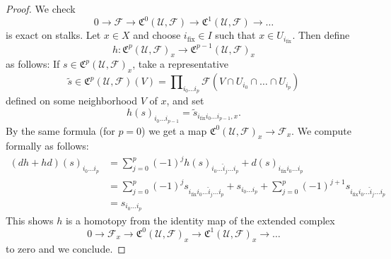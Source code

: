 \begin{proof}
We check
$$
0 \to \mathcal{F} \to \mathfrak{C}^0(\mathcal{U}, \mathcal{F}) \to
\mathfrak{C}^1(\mathcal{U}, \mathcal{F}) \to  \ldots
$$
is exact on stalks. Let $x \in X$ and choose $i_{\text{fix}} \in I$
such that $x \in U_{i_{\text{fix}}}$. Then define
$$
h : \mathfrak{C}^p(\mathcal{U}, \mathcal{F})_x
\to \mathfrak{C}^{p - 1}(\mathcal{U}, \mathcal{F})_x
$$
as follows: If $s \in \mathfrak{C}^p(\mathcal{U}, \mathcal{F})_x$, take
a representative
$$
\widetilde{s} \in
\mathfrak{C}^p(\mathcal{U}, \mathcal{F})(V) =
\prod\nolimits_{i_0 \ldots i_p}
\mathcal{F}(V \cap U_{i_0} \cap \ldots \cap U_{i_p})
$$
defined on some neighborhood $V$ of $x$, and set
$$
h(s)_{i_0 \ldots i_{p - 1}} =
\widetilde{s}_{i_{\text{fix}} i_0 \ldots i_{p - 1}, x}.
$$
By the same formula (for $p = 0$) we get a map
$\mathfrak{C}^{0}(\mathcal{U},\mathcal{F})_x \to \mathcal{F}_x$.
We compute formally as follows:
\begin{align*}
(dh + hd)(s)_{i_0 \ldots i_p}
& =
\sum\nolimits_{j = 0}^p
(-1)^j
h(s)_{i_0 \ldots \hat i_j \ldots i_p}
+
d(s)_{i_{\text{fix}} i_0 \ldots i_p}\\
& =
\sum\nolimits_{j = 0}^p
(-1)^j
s_{i_{\text{fix}} i_0 \ldots \hat i_j \ldots i_p}
+
s_{i_0 \ldots i_p}
+
\sum\nolimits_{j = 0}^p
(-1)^{j + 1}
s_{i_{\text{fix}} i_0 \ldots \hat i_j \ldots i_p} \\
& =
s_{i_0 \ldots i_p}
\end{align*}
This shows $h$ is a homotopy from the identity map of
the extended complex
$$
0 \to \mathcal{F}_x \to \mathfrak{C}^0(\mathcal{U}, \mathcal{F})_x
\to \mathfrak{C}^1(\mathcal{U}, \mathcal{F})_x \to \ldots
$$
to zero and we conclude.
\end{proof}

